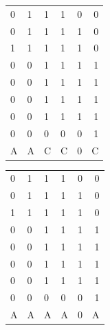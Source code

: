 	\begin{multicols}{2}

		\begin{tabular}{ l l |l l c r }
		  
		  0 & 1 & 1 & 1 & 0 & 0 \\
		  0 & 1 & 1 & 1 & 1 & 0 \\
		  1 & 1 & 1 & 1 & 1 & 0 \\
		  \hline
		  0 & 0 & 1 & 1 & 1 & 1 \\
		  0 & 0 & 1 & 1 & 1 & 1 \\
		  0 & 0 & 1 & 1 & 1 & 1 \\
		  0 & 0 & 1 & 1 & 1 & 1 \\
		  0 & 0 & 0 & 0 & 0 & 1 \\
		  \hline	
		  A & A & C & C & 0 & C \\
		
		\end{tabular}
	\columnbreak{|}
		\begin{tabular}{ l l | l l c r }
		  0 & 1 & 1 & 1 & 0 & 0 \\
		  0 & 1 & 1 & 1 & 1 & 0 \\
		  1 & 1 & 1 & 1 & 1 & 0 \\
		  \hline
		  0 & 0 & 1 & 1 & 1 & 1 \\
		  0 & 0 & 1 & 1 & 1 & 1 \\
		  0 & 0 & 1 & 1 & 1 & 1 \\
		  0 & 0 & 1 & 1 & 1 & 1 \\
		  0 & 0 & 0 & 0 & 0 & 1 \\
		  \hline
		  A & A & A & A & 0 & A\\

		\end{tabular}

	\end{multicols}

\newpage


